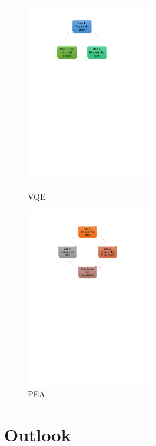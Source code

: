 \documentclass[14pt,landscape,color=UCLdarkred,margin=3cm]{uclposter}
\begin{document}
\begin{multicols}{3}
\begin{figure}[H]
  \begin{center}
   \begin{minipage}[c]{15em}
    \includegraphics[width=15em]{VQEdiagram.pdf}
    \caption{VQE}
  \end{minipage}
  \qquad
  \begin{minipage}[c]{15em}
    \includegraphics[width=15em]{PEA.pdf}
    \caption{PEA}
  \end{minipage}
  \end{center}

   
\end{figure}



\section*{Outlook}


\end{multicols}
\end{document}
